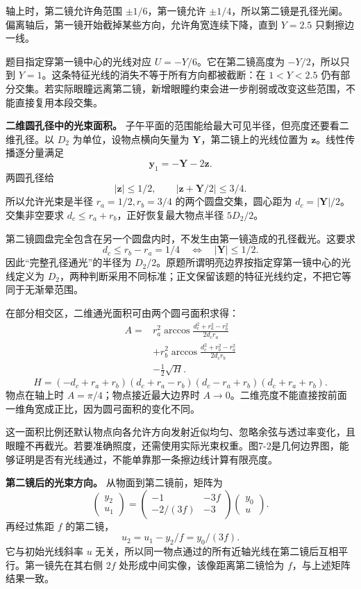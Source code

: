 \documentclass[12pt,a4paper,UTF8]{ctexart}
\begin{document}
轴上时，第二镜允许角范围 \(\pm1/6\)，第一镜允许
\(\pm1/4\)，所以第二镜是孔径光阑。偏离轴后，第一镜开始截掉某些方向，允许角宽连续下降，直到
\(Y=2.5\) 只剩擦边一线。

题目指定穿第一镜中心的光线对应 \(U=-Y/6\)。它在第二镜高度为
\(-Y/2\)，所以只到 \(Y=1\)。这条特征光线的消失不等于所有方向都被截断：在
\(1<Y<2.5\)
仍有部分交集。若实际眼瞳远离第二镜，新增眼瞳约束会进一步削弱或改变这些范围，不能直接复用本段交集。

\textbf{二维圆孔径中的光束面积。}
子午平面的范围能给最大可见半径，但亮度还要看二维孔径。以 \(D_2\)
为单位，设物点横向矢量为 \(\bm Y\)，第二镜上的光线位置为
\(\bm z\)。线性传播逐分量满足 \[
\bm y_1=-\bm Y-2\bm z.
\] 两圆孔径给 \[
|\bm z|\le1/2,
\qquad |\bm z+\bm Y/2|\le3/4.
\] 所以允许光束是半径 \(r_a=1/2,r_b=3/4\) 的两个圆盘交集，圆心距为
\(d_c=|\bm Y|/2\)。交集非空要求 \(d_c\le r_a+r_b\)，正好恢复最大物点半径
\(5D_2/2\)。

第二镜圆盘完全包含在另一个圆盘内时，不发生由第一镜造成的孔径截光。这要求
\[
d_c\le r_b-r_a=1/4\quad\Longleftrightarrow\quad |\bm Y|\le1/2.
\] 因此``完整孔径通光''的半径为
\(D_2/2\)。原题所谓明亮边界按指定穿第一镜中心的光线定义为
\(D_2\)，两种判断采用不同标准；正文保留该题的特征光线约定，不把它等同于无渐晕范围。

在部分相交区，二维通光面积可由两个圆弓面积求得： \[
\begin{aligned}
A={}&r_a^2\arccos\frac{d_c^2+r_a^2-r_b^2}{2d_cr_a}
\\
&+r_b^2\arccos\frac{d_c^2+r_b^2-r_a^2}{2d_cr_b}
\\
&-\frac12\sqrt{H}.
\end{aligned}
\] \[
H=(-d_c+r_a+r_b)(d_c+r_a-r_b)
(d_c-r_a+r_b)(d_c+r_a+r_b).
\] 物点在轴上时 \(A=\pi/4\)；物点接近最大边界时
\(A\to0\)。二维亮度不能直接按前面一维角宽成正比，因为圆弓面积的变化不同。

这一面积比例还默认物点向各允许方向发射近似均匀、忽略余弦与透过率变化，且眼瞳不再截光。若要准确照度，还需使用实际光束权重。图7-2是几何边界图，能够证明是否有光线通过，不能单靠那一条擦边线计算有限亮度。

\textbf{第二镜后的光束方向。} 从物面到第二镜前，矩阵为 \[
\begin{pmatrix}y_2\\u_1\end{pmatrix}
=\begin{pmatrix}-1&-3f\\-2/(3f)&-3\end{pmatrix}
\begin{pmatrix}y_0\\u\end{pmatrix}.
\] 再经过焦距 \(f\) 的第二镜， \[
u_2=u_1-y_2/f=y_0/(3f).
\] 它与初始光线斜率 \(u\)
无关，所以同一物点通过的所有近轴光线在第二镜后互相平行。第一镜先在其右侧
\(2f\) 处形成中间实像，该像距离第二镜恰为 \(f\)，与上述矩阵结果一致。
\end{document}
